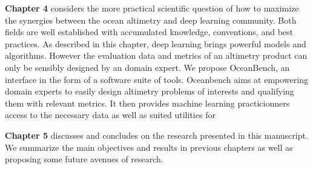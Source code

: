 \begin{bibunit}
\textbf{Chapter 4} considers the more practical scientific question of how to maximize the synergies between the ocean altimetry and deep learning community.
Both fields are well established with accumulated knowledge, conventions, and best practices. 
As described in this chapter, deep learning brings powerful models and algorithms.
However the evaluation data and metrics of an altimetry product can only be sensibly designed by an domain expert. 
We propose OceanBench, an interface in the form of a software suite of tools.
Oceanbench aims at empowering domain experts to easily design altimetry problems of interests and qualifying them with relevant metrics. 
It then provides machine learning practicionners access to the necessary data as well as suited utilities for 

\textbf{Chapter 5} discusses and concludes on the research presented in this manuscript. We summarize the main objectives and results in previous chapters as well as proposing some future avenues of research.
 
\end{bibunit}

